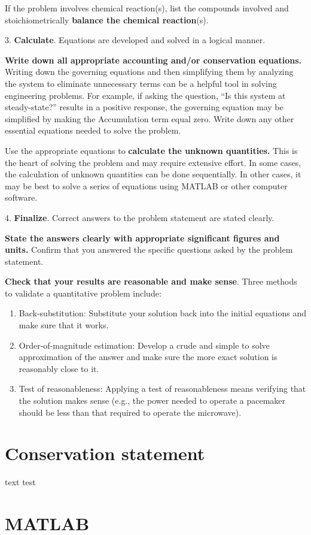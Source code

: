 \documentclass{article}
\begin{document}
If the problem involves chemical reaction(s), list the compounds involved and stoichiometrically \textbf{balance the chemical reaction}(s). 

3. \textbf{Calculate}. Equations are developed and solved in a logical manner.

\textbf{Write down all appropriate accounting and/or conservation equations.} Writing down the governing equations and then simplifying them by analyzing the system to eliminate unnecessary terms can be a helpful tool in solving engineering problems. For example, if asking the question, “Is this system at steady-state?” results in a positive response, the governing equation may be simplified by making the Accumulation term equal zero. Write down any other essential equations needed to solve the problem.

Use the appropriate equations to \textbf{calculate the unknown quantities.} This is the heart of solving the problem and may require extensive effort. In some cases, the calculation of unknown quantities can be done sequentially. In other cases, it may be best to solve a series of equations using MATLAB or other computer software.

4. \textbf{Finalize}. Correct answers to the problem statement are stated clearly.

\textbf{State the answers clearly with appropriate significant figures and units.} Confirm that you answered the specific questions asked by the problem statement.

\textbf{Check that your results are reasonable and make sense}. Three methods to validate a quantitative problem include:
\begin{enumerate}
    \item Back-substitution: Substitute your solution back into the initial equations and make sure that it works.
    \item Order-of-magnitude estimation: Develop a crude and simple to solve approximation of the answer and make sure the more exact solution is reasonably close to it. 
    \item Test of reasonableness: Applying a test of reasonableness means verifying that the solution makes sense (e.g., the power needed to operate a pacemaker should be less than that required to operate the microwave).
\end{enumerate}


\section{Conservation statement}

text test 
\section{MATLAB}
\end{document}
